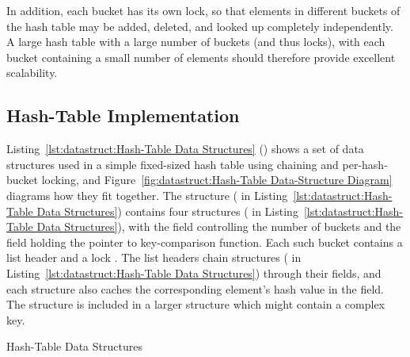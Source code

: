 \QuickQuizEnd

In addition, each bucket has its own lock, so that elements in different
buckets of the hash table may be added, deleted, and looked up completely
independently.
A large hash table with a large number of buckets (and thus locks), with
each bucket containing a small number of elements should therefore provide
excellent scalability.

\subsection{Hash-Table Implementation}
\label{sec:datastruct:Hash-Table Implementation}

\begin{fcvref}
Listing~\ref{lst:datastruct:Hash-Table Data Structures}
()
shows a set of data structures used in a simple fixed-sized hash
table using chaining and per-hash-bucket locking, and
Figure~\ref{fig:datastruct:Hash-Table Data-Structure Diagram}
diagrams how they fit together.
The  structure ( in
Listing~\ref{lst:datastruct:Hash-Table Data Structures})
contains four  structures
( in
Listing~\ref{lst:datastruct:Hash-Table Data Structures}),
with the  field controlling the number of buckets
and the  field holding the pointer to key-comparison
function.
Each such bucket contains a list header  and
a lock .
The list headers chain  structures
( in
Listing~\ref{lst:datastruct:Hash-Table Data Structures})
through their
 fields, and each  structure also caches
the corresponding element's hash value in the  field.
The  structure is included in a larger structure
which might contain a complex key.
\end{fcvref}

\begin{listing}

\caption{Hash-Table Data Structures}
\label{lst:datastruct:Hash-Table Data Structures}
\end{listing}

